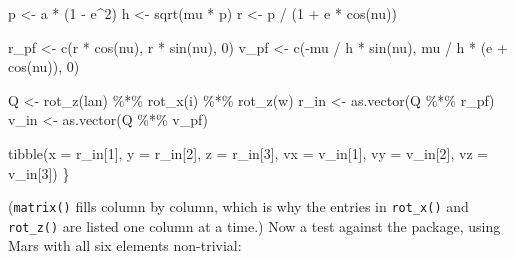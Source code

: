 \documentclass[
  10.5pt,
  letterpaper,
]{scrbook}
\newenvironment{Shaded}{\begin{snugshade}}{\end{snugshade}}
\newcommand{\AttributeTok}[1]{\textcolor[rgb]{0.00,0.00,0.00}{#1}}
\newcommand{\DecValTok}[1]{\textcolor[rgb]{0.00,0.00,0.00}{#1}}
\newcommand{\FunctionTok}[1]{\textcolor[rgb]{0.00,0.00,0.00}{#1}}
\newcommand{\NormalTok}[1]{\textcolor[rgb]{0.00,0.00,0.00}{#1}}
\newcommand{\OtherTok}[1]{\textcolor[rgb]{0.00,0.00,0.00}{#1}}
\newcommand{\SpecialCharTok}[1]{\textcolor[rgb]{0.00,0.00,0.00}{#1}}
\theoremstyle{definition}
\theoremstyle{plain}
\theoremstyle{remark}
\begin{document}
\begin{Shaded}
\begin{Highlighting}[]
\NormalTok{  p }\OtherTok{\textless{}{-}}\NormalTok{ a }\SpecialCharTok{*}\NormalTok{ (}\DecValTok{1} \SpecialCharTok{{-}}\NormalTok{ e}\SpecialCharTok{\^{}}\DecValTok{2}\NormalTok{)}
\NormalTok{  h }\OtherTok{\textless{}{-}} \FunctionTok{sqrt}\NormalTok{(mu }\SpecialCharTok{*}\NormalTok{ p)}
\NormalTok{  r }\OtherTok{\textless{}{-}}\NormalTok{ p }\SpecialCharTok{/}\NormalTok{ (}\DecValTok{1} \SpecialCharTok{+}\NormalTok{ e }\SpecialCharTok{*} \FunctionTok{cos}\NormalTok{(nu))}

\NormalTok{  r\_pf }\OtherTok{\textless{}{-}} \FunctionTok{c}\NormalTok{(r }\SpecialCharTok{*} \FunctionTok{cos}\NormalTok{(nu), r }\SpecialCharTok{*} \FunctionTok{sin}\NormalTok{(nu), }\DecValTok{0}\NormalTok{)}
\NormalTok{  v\_pf }\OtherTok{\textless{}{-}} \FunctionTok{c}\NormalTok{(}\SpecialCharTok{{-}}\NormalTok{mu }\SpecialCharTok{/}\NormalTok{ h }\SpecialCharTok{*} \FunctionTok{sin}\NormalTok{(nu), mu }\SpecialCharTok{/}\NormalTok{ h }\SpecialCharTok{*}\NormalTok{ (e }\SpecialCharTok{+} \FunctionTok{cos}\NormalTok{(nu)), }\DecValTok{0}\NormalTok{)}

\NormalTok{  Q }\OtherTok{\textless{}{-}} \FunctionTok{rot\_z}\NormalTok{(lan) }\SpecialCharTok{\%*\%} \FunctionTok{rot\_x}\NormalTok{(i) }\SpecialCharTok{\%*\%} \FunctionTok{rot\_z}\NormalTok{(w)}
\NormalTok{  r\_in }\OtherTok{\textless{}{-}} \FunctionTok{as.vector}\NormalTok{(Q }\SpecialCharTok{\%*\%}\NormalTok{ r\_pf)}
\NormalTok{  v\_in }\OtherTok{\textless{}{-}} \FunctionTok{as.vector}\NormalTok{(Q }\SpecialCharTok{\%*\%}\NormalTok{ v\_pf)}

  \FunctionTok{tibble}\NormalTok{(}\AttributeTok{x =}\NormalTok{ r\_in[}\DecValTok{1}\NormalTok{], }\AttributeTok{y =}\NormalTok{ r\_in[}\DecValTok{2}\NormalTok{], }\AttributeTok{z =}\NormalTok{ r\_in[}\DecValTok{3}\NormalTok{],}
         \AttributeTok{vx =}\NormalTok{ v\_in[}\DecValTok{1}\NormalTok{], }\AttributeTok{vy =}\NormalTok{ v\_in[}\DecValTok{2}\NormalTok{], }\AttributeTok{vz =}\NormalTok{ v\_in[}\DecValTok{3}\NormalTok{])}
\NormalTok{\}}
\end{Highlighting}
\end{Shaded}

(\texttt{matrix()} fills column by column, which is why the entries in
\texttt{rot\_x()} and \texttt{rot\_z()} are listed one column at a
time.) Now a test against the package, using Mars with all six elements
non-trivial:
\end{document}
